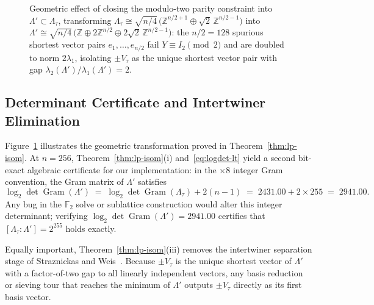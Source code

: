 \documentclass[11pt,a4paper]{article}
\theoremstyle{definition}
\newcommand{\Z}{\mathbb{Z}}
\newcommand{\F}{\mathbb{F}}
\newcommand{\Lt}{\Lambda_\tau}
\newcommand{\Lp}{\Lambda'}
\newcommand{\Vt}{V_\tau}
\newcommand{\Gram}{\operatorname{Gram}}
\begin{document}
\begin{figure}[t]
\caption{Geometric effect of closing the modulo-two parity constraint into $\Lp \subset \Lt$, transforming $\Lt \cong \sqrt{n/4}\,\bigl(\Z^{n/2+1}\oplus\sqrt{2}\,\Z^{n/2-1}\bigr)$ into $\Lp \cong \sqrt{n/4}\,\bigl(\Z\oplus 2\Z^{n/2}\oplus 2\sqrt{2}\,\Z^{n/2-1}\bigr)$: the $n/2=128$ spurious shortest vector pairs $e_1, \dots, e_{n/2}$ fail $Y\equiv I_2\pmod 2$ and are doubled to norm $2\lambda_1$, isolating $\pm\Vt$ as the unique shortest vector pair with gap $\lambda_2(\Lp)/\lambda_1(\Lp)=2$.}
\label{fig:lt-vs-lp}
\end{figure}

\subsection{Determinant Certificate and Intertwiner Elimination}
Figure~\ref{fig:lt-vs-lp} illustrates the geometric transformation proved in Theorem~\ref{thm:lp-isom}. At $n=256$, Theorem~\ref{thm:lp-isom}(i) and~\eqref{eq:logdet-lt} yield a second bit-exact algebraic certificate for our implementation: in the $\times 8$ integer Gram convention, the Gram matrix of $\Lp$ satisfies
\begin{equation}\label{eq:logdet-lp}
  \log_2 \det \Gram(\Lp) \;=\; \log_2 \det \Gram(\Lt) + 2(n-1) \;=\; 2431.00 + 2 \times 255 \;=\; 2941.00.
\end{equation}
Any bug in the $\F_2$ solve or sublattice construction would alter this integer determinant; verifying $\log_2 \det \Gram(\Lp) = 2941.00$ certifies that $[\Lt : \Lp] = 2^{255}$ holds exactly.

Equally important, Theorem~\ref{thm:lp-isom}(iii) removes the intertwiner separation stage of Straznickas and Weis~\cite[Remark~6.2]{SW26}. Because $\pm\Vt$ is the unique shortest vector of $\Lp$ with a factor-of-two gap to all linearly independent vectors, any basis reduction or sieving tour that reaches the minimum of $\Lp$ outputs $\pm\Vt$ directly as its first basis vector.
\end{document}
